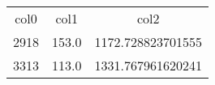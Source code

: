 \begin{table}
\begin{tabular}{ccc}
col0 & col1 & col2 \\
2918 & 153.0 & 1172.728823701555 \\
3313 & 113.0 & 1331.767961620241 \\
\end{tabular}
\end{table}
